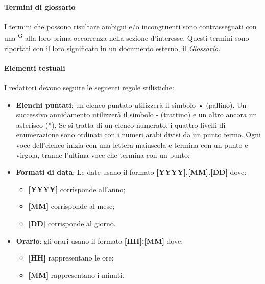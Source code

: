 \paragraph{Termini di glossario}
I termini che possono risultare ambigui e/o incongruenti sono contrassegnati con una \textsuperscript{G} alla loro prima occorrenza nella sezione d’interesse. Questi termini sono riportati con il loro significato in un documento esterno, il \textit{Glossario}.

\paragraph{Elementi testuali}
I redattori devono seguire le seguenti regole stilistiche:
\begin{itemize}
\item \textbf{Elenchi puntati}: un elenco puntato utilizzerà il simbolo • (pallino). Un successivo annidamento utilizzerà il simbolo - (trattino) e un altro ancora un asterisco (*). Se si tratta di un elenco numerato, i quattro livelli di enumerazione sono ordinati con i numeri arabi divisi da un punto fermo. Ogni voce dell’elenco inizia con una lettera maiuscola e termina con un punto e virgola, tranne l'ultima voce che termina con un punto;

\item \textbf{Formati di data}: Le date usano il formato \textbf{[YYYY].[MM].[DD]} dove:
    \begin{itemize}
    \item \textbf{[YYYY]} corrisponde all’anno;
    \item \textbf{[MM]} corrisponde al mese;
    \item \textbf{[DD]} corrisponde al giorno.
    \end{itemize}

\item \textbf{Orario}: gli orari usano il formato \textbf{[HH]:[MM]} dove:
    \begin{itemize}
    \item \textbf{[HH]} rappresentano le ore;
    \item \textbf{[MM]} rappresentano i minuti.
    \end{itemize}


\end{itemize}
